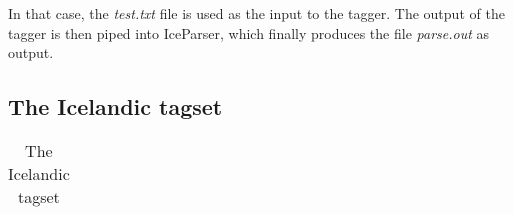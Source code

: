 \documentclass[11pt]{article}
\begin{document}
In that case, the \emph{test.txt} file is used as the input to the tagger.  The output of the tagger is then piped into IceParser, which finally produces the file \emph{parse.out} as output.


\newpage
\begin{spacing}{1.0}


\end{spacing}

\newpage
\begin{spacing}{1.0}
\appendix
{}
\section{The Icelandic tagset}
\begin{table}[h]
\begin{center}
{\scriptsize
\caption{The Icelandic tagset}
\begin{tabular}{lll}
\hline
\hline


\end{tabular}}
\end{center}
\end{table}
\end{spacing}
\end{document}
